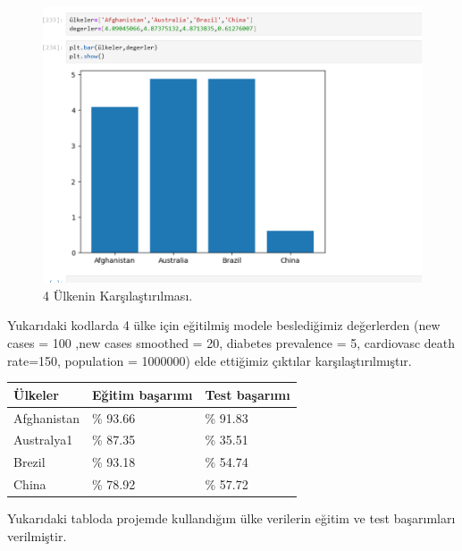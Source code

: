 \documentclass[12pt, a4paper]{article}
\begin{document}
\begin{figure}[!htbp] 
	
	\centering
	\includegraphics[angle=0, width=\textwidth]{14.png}
	\caption{4 Ülkenin Karşılaştırılması.}
\end{figure}
Yukarıdaki kodlarda 4 ülke için eğitilmiş modele beslediğimiz değerlerden (new cases = 100 ,new cases smoothed = 20, diabetes prevalence = 5, cardiovasc death rate=150, population = 1000000) elde ettiğimiz çıktılar karşılaştırılmıştır.
\newline
\begin{centering}
	
\begin{tabular}{lll}
	\hline
	Ülkeler  & Eğitim başarımı & Test başarımı \\ \hline
	Afghanistan & \% 93.66 & \% 91.83 \\
	Australya1 & \% 87.35 & \% 35.51 \\
	Brezil & \% 93.18 & \% 54.74 \\
	China & \% 78.92 & \% 57.72 \\
	\hline
\end{tabular}
\end{centering}
\newline Yukarıdaki tabloda projemde kullandığım ülke verilerin eğitim ve test başarımları verilmiştir.



\end{document}

